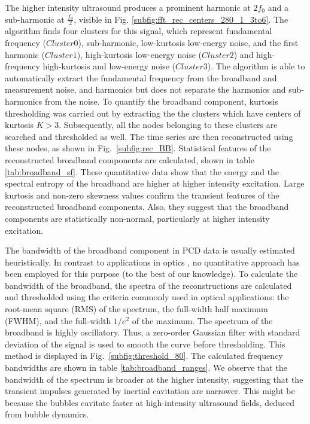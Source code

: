 \documentclass[preprint, linenumbers]{revtex4-2}
\begin{document}
The higher intensity ultrasound produces a prominent harmonic at $2f_0$ and a sub-harmonic at $\frac{f_0}{2}$, visible in Fig. \ref{subfig:fft_rec_centers_280_1_3to6}. The algorithm finds four clusters for this signal, which represent fundamental frequency ($Cluster 0$), sub-harmonic, low-kurtosis low-energy noise, and the first harmonic ($Cluster 1$), high-kurtosis low-energy noise ($Cluster 2$) and high-frequency high-kurtosis and low-energy noise ($Cluster 3$). The algorithm is able to automatically extract the fundamental frequency from the broadband and measurement noise, and harmonics but does not separate the harmonics and sub-harmonics from the noise. To quantify the broadband component, kurtosis thresholding was carried out by extracting the the clusters which have centers of kurtosis $K>3$. Subsequently, all the nodes belonging to these clusters are searched and thresholded as well. The time series are then reconstructed using these nodes, as shown in Fig.~\ref{subfig:rec_BB}. Statistical features of the reconstructed broadband components are calculated, shown in table \ref{tab:broadband_sf}. These quantitative data show that the energy and the spectral entropy of the broadband are higher at higher intensity excitation. Large kurtosis and non-zero skewness values confirm the transient features of the reconstructed broadband components. Also, they suggest that the broadband components are statistically non-normal, particularly at higher intensity excitation.

The bandwidth of the broadband component in PCD data is usually estimated heuristically. In contrast to applications in optics \cite{keller1989noise}, no quantitative approach has been employed for this purpose (to the best of our knowledge). To calculate the bandwidth of the broadband, the spectra of the reconstructions are calculated and thresholded using the criteria commonly used in optical applications: the root-mean square (RMS) of the spectrum, the full-width half maximum (FWHM), and the full-width $1/e^2$ of the maximum. The spectrum of the broadband is highly oscillatory. Thus, a zero-order Gaussian filter with standard deviation of the signal is used to smooth the curve before thresholding. This method is displayed in Fig.~\ref{subfig:threshold_80}. The calculated frequency bandwidths are shown in table \ref{tab:broadband_ranges}. We observe that the bandwidth of the spectrum is broader at the higher intensity, suggesting that the transient impulses generated by inertial cavitation are narrower. This might be because the bubbles cavitate faster at high-intensity ultrasound fields, deduced from bubble dynamics.  
\end{document}
